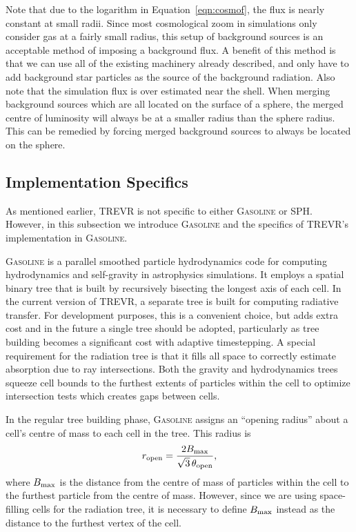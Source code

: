 \documentclass[fleq,usenatbib]{mnras}
\newcommand{\acro}{TREVR}
\newcommand{\tO}{\theta_{\rm open}}
\begin{document}
{Note that due to the logarithm in Equation~\ref{eqn:cosmof}, the flux is 
nearly constant at small radii. Since most cosmological zoom in simulations 
only consider gas at a fairly small radius, this setup of background sources 
is an acceptable method of imposing a background flux. A benefit of this 
method is that we can use all of the existing machinery already described, and 
only have to add background star particles as the source of the 
background radiation. Also note that the simulation flux is over estimated 
near the shell.  When merging 
background sources which are all located on the surface of a sphere, the 
merged centre of luminosity will always be at a smaller radius than the sphere 
radius. This can be remedied by forcing merged background sources to always be 
located on the sphere. 

\subsection{Implementation Specifics}\label{sec:specs}
As mentioned earlier, \acro{} is not specific to either \textsc{Gasoline} or 
SPH.  However, in this subsection we 
introduce \textsc{Gasoline} and the specifics of \acro{}'s implementation in 
\textsc{Gasoline}.

\textsc{Gasoline} is a parallel smoothed particle hydrodynamics code for 
computing hydrodynamics and self-gravity in astrophysics simulations. It 
employs a spatial binary tree that is built by recursively bisecting the 
longest axis of each cell. In the current version of \acro{}, a separate tree 
is built for computing radiative transfer. For development purposes, this is a 
convenient choice, but adds extra cost and in the future a single tree
should be adopted, particularly as tree building becomes a significant cost
with adaptive timestepping. A special requirement for the radiation tree is 
that it fills all space to correctly estimate absorption due to ray 
intersections. Both the gravity and hydrodynamics trees squeeze cell bounds to 
the furthest extents of particles within the cell to optimize intersection 
tests which creates gaps between cells.

In the regular tree building phase, \textsc{Gasoline} assigns an ``opening 
radius'' about a cell's centre of mass to each cell in the tree. This radius is
\begin{equation}
r_{\rm open} = \frac{2 B_{\rm max}}{\sqrt{3}\, \tO},
\end{equation}
where $B_{\rm max}$ is the  distance from the centre of mass of particles 
within the cell to the furthest particle from the centre of mass. However, 
since we are using space-filling cells for the radiation tree, it is necessary 
to define $B_{\rm max}$ instead as the distance to the furthest vertex of the 
cell.

}
\end{document}
